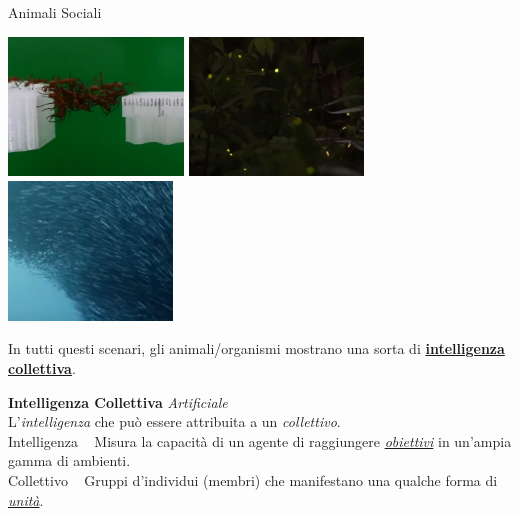 \documentclass[presentation, 10pt,aspectratio=169]{beamer}\mode<presentation>{\usetheme{AMSBolognaFC}}
\begin{document}
\begin{frame}[fragile]{Animali Sociali}
\begin{center}
	\href{https://youtu.be/IpKL-URul2I}{\includegraphics[height=3.7cm]{img/example.png}}
	\href{https://www.youtube.com/watch?v=ZGvtnE1Wy6U&t=37s}{\includegraphics[height=3.7cm]{img/fireflies.png}}
	\href{https://youtu.be/B6M_XgiONoo}{\includegraphics[height=3.7cm]{img/school.png}}
\end{center}
In tutti questi scenari, gli animali/organismi mostrano una sorta di \underline{\alert{\textbf{intelligenza collettiva}}}.
\end{frame}
{


\begin{frame}[c]
	
	{
	\color{customfg}

	\begin{center}
	\Large\textbf{Intelligenza Collettiva} \emph{Artificiale} \\
	
	L'\alert{\emph{intelligenza}} che può essere attribuita a un \alert{\emph{collettivo}}.
	\\ \vspace{1cm}
		\large{\alert{Intelligenza}} \faArrowRight ~ Misura la capacità di un agente di raggiungere \underline{\emph{obiettivi}} in un'ampia gamma di ambienti.  \\

		\large{\alert{Collettivo}} \faArrowRight ~ Gruppi d'individui (membri) che manifestano una qualche forma di \underline{\emph{unità}}. \\

	\end{center}

	\vspace{1cm}	
}
\end{frame}
}
\end{document}
